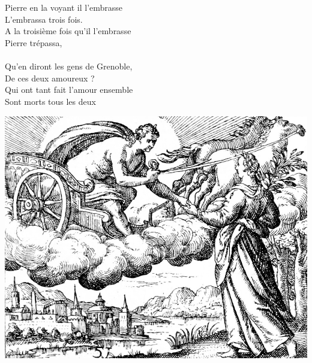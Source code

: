 \breakpage
\\\\Pierre en la voyant il l'embrasse
\\L'embrassa trois fois.
\\A la troisième fois qu'il l'embrasse
\\Pierre trépassa,  \bissimple
\\\\Qu'en diront les gens de Grenoble,
\\De ces deux amoureux ?
\\Qui ont tant fait l'amour ensemble
\\Sont morts tous les deux  \bissimple
\bigskip
\bigskip
\begin{center}
\includegraphics[width=1\textwidth]{images/brev14.png}
\end{center}

\breakpage